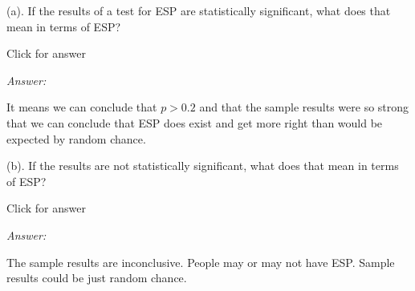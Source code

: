 \documentclass[
]{book}
\begin{document}
(a). If the results of a test for ESP are statistically significant, what does that mean in terms of ESP?

Click for answer

\emph{Answer:}

It means we can conclude that \(p > 0.2\) and that the sample results were so strong that we can conclude that ESP does exist and get more right than would be expected by random chance.

(b). If the results are not statistically significant, what does that mean in terms of ESP?

Click for answer

\emph{Answer:}

The sample results are inconclusive. People may or may not have ESP. Sample results could be just random chance.

  
\end{document}
